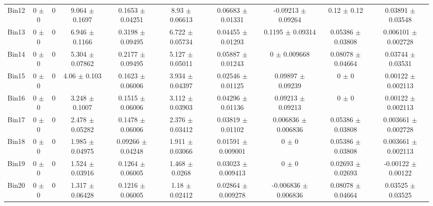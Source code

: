\begin{tabular}{@{\extracolsep{4pt}}lccccccccc@{}}
     Bin12 & 0 $\pm$ 0 & 0 & 9.064 $\pm$ 0.1697 & 0.1653 $\pm$ 0.04251 & 8.93 $\pm$ 0.06613 & 0.06683 $\pm$ 0.01331 & -0.09213 $\pm$ 0.09264 & 0.12 $\pm$ 0.12 & 0.03891 $\pm$ 0.03548 \\ 
     Bin13 & 0 $\pm$ 0 & 0 & 6.946 $\pm$ 0.1166 & 0.3198 $\pm$ 0.09495 & 6.722 $\pm$ 0.05734 & 0.04455 $\pm$ 0.01293 & 0.1195 $\pm$ 0.09314 & 0.05386 $\pm$ 0.03808 & 0.006101 $\pm$ 0.002728 \\ 
     Bin14 & 0 $\pm$ 0 & 0 & 5.304 $\pm$ 0.07862 & 0.2177 $\pm$ 0.09495 & 5.127 $\pm$ 0.05011 & 0.05887 $\pm$ 0.01243 & 0 $\pm$ 0.009668 & 0.08078 $\pm$ 0.04664 & 0.03744 $\pm$ 0.03531 \\ 
     Bin15 & 0 $\pm$ 0 & 0 & 4.06 $\pm$ 0.103 & 0.1623 $\pm$ 0.06006 & 3.934 $\pm$ 0.04397 & 0.02546 $\pm$ 0.01125 & 0.09897 $\pm$ 0.09239 & 0 $\pm$ 0 & 0.00122 $\pm$ 0.002113 \\ 
     Bin16 & 0 $\pm$ 0 & 0 & 3.248 $\pm$ 0.1007 & 0.1515 $\pm$ 0.06006 & 3.112 $\pm$ 0.03903 & 0.04296 $\pm$ 0.01136 & 0.09213 $\pm$ 0.09213 & 0 $\pm$ 0 & 0.00122 $\pm$ 0.002113 \\ 
     Bin17 & 0 $\pm$ 0 & 0 & 2.478 $\pm$ 0.05282 & 0.1478 $\pm$ 0.06006 & 2.376 $\pm$ 0.03412 & 0.03819 $\pm$ 0.01102 & 0.006836 $\pm$ 0.006836 & 0.05386 $\pm$ 0.03808 & 0.003661 $\pm$ 0.002728 \\ 
     Bin18 & 0 $\pm$ 0 & 0 & 1.985 $\pm$ 0.04975 & 0.09266 $\pm$ 0.04248 & 1.911 $\pm$ 0.03066 & 0.01591 $\pm$ 0.009001 & 0 $\pm$ 0 & 0.05386 $\pm$ 0.03808 & 0.003661 $\pm$ 0.002113 \\ 
     Bin19 & 0 $\pm$ 0 & 0 & 1.524 $\pm$ 0.03916 & 0.1264 $\pm$ 0.06005 & 1.468 $\pm$ 0.0268 & 0.03023 $\pm$ 0.009413 & 0 $\pm$ 0 & 0.02693 $\pm$ 0.02693 & -0.00122 $\pm$ 0.00122 \\ 
     Bin20 & 0 $\pm$ 0 & 0 & 1.317 $\pm$ 0.06428 & 0.1216 $\pm$ 0.06005 & 1.18 $\pm$ 0.02412 & 0.02864 $\pm$ 0.009278 & -0.006836 $\pm$ 0.006836 & 0.08078 $\pm$ 0.04664 & 0.03525 $\pm$ 0.03525 \\ 
\hline\hline
  \end{tabular}
